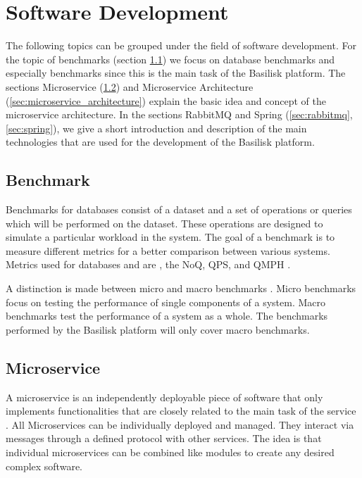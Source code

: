 \section{Software Development}
\label{sec:software_dev}
The following topics can be grouped under the field of software development.
For the topic of benchmarks (section \ref{sec:benchmark}) we focus on database benchmarks and especially \ts{} benchmarks since this is the main task of the Basilisk platform.
The sections Microservice (\ref{sec:microservice}) and Microservice Architecture (\ref{sec:microservice_architecture}) explain the basic idea and concept of the microservice architecture.
In the sections RabbitMQ and Spring (\ref{sec:rabbitmq}, \ref{sec:spring}), we give a short introduction and description of the main technologies that are used for the development of the Basilisk platform.

\subsection{Benchmark}
\label{sec:benchmark}
Benchmarks for databases consist of a dataset and a set of operations or queries which will be performed on the dataset.
These operations are designed to simulate a particular workload in the system.
The goal of a benchmark is to measure different metrics for a better comparison between various systems.
Metrics used for databases and \tsp{} are \eg, the \ac{NoQ}, \ac{QPS}, and \ac{QMPH} \cite{IguanaDocsMetrics}.

A distinction is made between micro and macro benchmarks \cite{gibbsMicrobenchmarksVsMacrobenchmarks}.
Micro benchmarks focus on testing the performance of single components of a system.
Macro benchmarks test the performance of a system as a whole.
The benchmarks performed by the Basilisk platform will only cover macro benchmarks.

\subsection{Microservice}
\label{sec:microservice}
A microservice is an independently deployable piece of software that only implements functionalities that are closely related to the main task of the service \cite{dragoniMicroservicesYesterdayToday2017}.
All Microservices can be individually deployed and managed.
They interact via messages through a defined protocol with other services.
The idea is that individual microservices can be combined like modules to create any desired complex software.

